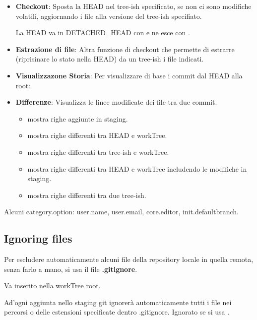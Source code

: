 \begin{itemize}
	\item \textbf{Checkout}: Sposta la HEAD nel tree-ish specificato, se non ci sono modifiche volatili, aggiornando i file alla versione del tree-ish specifiato.


	La HEAD va in DETACHED\_HEAD con  e ne esce con .

	\item \textbf{Estrazione di file}: Altra funzione di checkout che permette di estrarre (riprisinare lo stato nella HEAD) da un tree-ish i file indicati.


	\item \textbf{Visualizzazone Storia}: Per visualizzare di base i commit dal HEAD alla root:


	\item \textbf{Differenze}: Visualizza le linee modificate dei file tra due commit.
	\begin{itemize}
		\item {} mostra righe aggiunte in staging.
		\item {} mostra righe differenti tra HEAD e workTree.
		\item {} mostra righe differenti tra tree-ish e workTree.
		\item {} mostra righe differenti tra HEAD e workTree includendo le modifiche in staging.
		\item {} mostra righe differenti tra due tree-ish.
	\end{itemize}
\end{itemize}

Alcuni category.option: user.name, user.email, core.editor, init.defaultbranch.

\subsection{Ignoring files}
Per escludere automaticamente alcuni file della repository locale in quella remota, senza farlo a mano, si usa il file \textbf{.gitignore}.

Va inserito nella workTree root.

Ad'ogni aggiunta nello staging git ignorerà automaticamente tutti i file nei percorsi o delle estensioni specificate dentro .gitignore. Ignorato se si usa .

